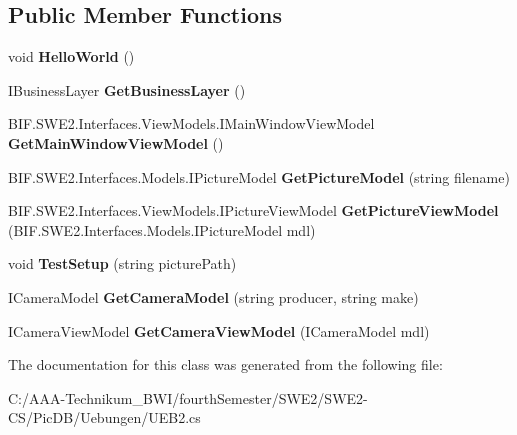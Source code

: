 \subsection*{Public Member Functions}
\begin{DoxyCompactItemize}
\item 
\mbox{\label{class_uebungen_1_1_u_e_b2_aee4a68d0bfa7235dc02a99a4c87baaa0}} 
void {\bfseries Hello\+World} ()
\item 
\mbox{\label{class_uebungen_1_1_u_e_b2_a7b259c9f2a1a2b9a0260d9dd86d338a5}} 
I\+Business\+Layer {\bfseries Get\+Business\+Layer} ()
\item 
\mbox{\label{class_uebungen_1_1_u_e_b2_a058d9137f95cc7af8bf0cfc67cd1aa37}} 
B\+I\+F.\+S\+W\+E2.\+Interfaces.\+View\+Models.\+I\+Main\+Window\+View\+Model {\bfseries Get\+Main\+Window\+View\+Model} ()
\item 
\mbox{\label{class_uebungen_1_1_u_e_b2_adcf64a8374b436d30bc24cb8abcd0f20}} 
B\+I\+F.\+S\+W\+E2.\+Interfaces.\+Models.\+I\+Picture\+Model {\bfseries Get\+Picture\+Model} (string filename)
\item 
\mbox{\label{class_uebungen_1_1_u_e_b2_af178efe49e9b38ba27208c0f82fbe5c8}} 
B\+I\+F.\+S\+W\+E2.\+Interfaces.\+View\+Models.\+I\+Picture\+View\+Model {\bfseries Get\+Picture\+View\+Model} (B\+I\+F.\+S\+W\+E2.\+Interfaces.\+Models.\+I\+Picture\+Model mdl)
\item 
\mbox{\label{class_uebungen_1_1_u_e_b2_aed6eb8c2827955f71f10b914a0f31311}} 
void {\bfseries Test\+Setup} (string picture\+Path)
\item 
\mbox{\label{class_uebungen_1_1_u_e_b2_a2ccfa7b41f31b06cfb9b242236aeb09a}} 
I\+Camera\+Model {\bfseries Get\+Camera\+Model} (string producer, string make)
\item 
\mbox{\label{class_uebungen_1_1_u_e_b2_aa58c0504a73cded17b02a6e5918736a5}} 
I\+Camera\+View\+Model {\bfseries Get\+Camera\+View\+Model} (I\+Camera\+Model mdl)
\end{DoxyCompactItemize}


The documentation for this class was generated from the following file\+:\begin{DoxyCompactItemize}
\item 
C\+:/\+A\+A\+A-\/\+Technikum\+\_\+\+B\+W\+I/fourth\+Semester/\+S\+W\+E2/\+S\+W\+E2-\/\+C\+S/\+Pic\+D\+B/\+Uebungen/U\+E\+B2.\+cs\end{DoxyCompactItemize}
